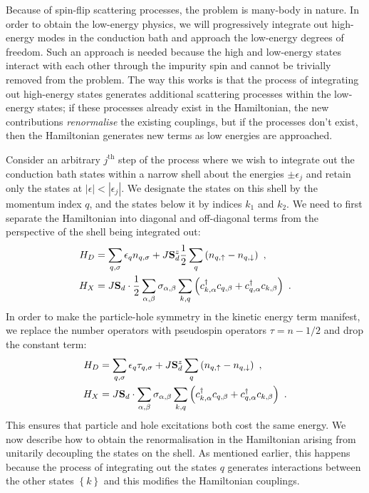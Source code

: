 Because of spin-flip scattering processes, the problem is many-body in nature. In order to obtain the low-energy physics, we will progressively integrate out high-energy modes in the conduction bath and approach the low-energy degrees of freedom. Such an approach is needed because the high and low-energy states interact with each other through the impurity spin and cannot be trivially removed from the problem. The way this works is that the process of integrating out high-energy states generates additional scattering processes within the low-energy states; if these processes already exist in the Hamiltonian, the new contributions {\it renormalise} the existing couplings, but if the processes don't exist, then the Hamiltonian generates new terms as low energies are approached.

Consider an arbitrary \(j^\text{th}\) step of the process where we wish to integrate out the conduction bath states within a narrow shell about the energies \(\pm \epsilon_j\) and retain only the states at \(|\epsilon| < |\epsilon_j|\). We designate the states on this shell by the momentum index \(q\), and the states below it by indices \(k_1 \) and \(k_2\). We need to first separate the Hamiltonian into diagonal and off-diagonal terms from the perspective of the shell being integrated out:
\begin{equation}\begin{aligned}
	H_D &= \sum_{q,\sigma} \epsilon_q n_{q,\sigma} + J {\bf S}_d^z \frac{1}{2}\sum_q \left(n_{q,\uparrow} - n_{q,\downarrow}\right)~,\\
	H_X &= J {\bf S}_d \cdot \frac{1}{2}\sum_{\alpha,\beta}{\bf \sigma}_{\alpha,\beta}\sum_{k, q} \left(c^\dagger_{k,\alpha}c_{q,\beta} + c^\dagger_{q,\alpha}c_{k,\beta}\right)~.
\end{aligned}\end{equation}
In order to make the particle-hole symmetry in the kinetic energy term manifest, we replace the number operators with pseudospin operators \(\tau = n - 1/2\) and drop the constant term:
\begin{equation}\begin{aligned}
	H_D &= \sum_{q,\sigma} \epsilon_q \tau_{q,\sigma} + J {\bf S}_d^z \sum_q \left(n_{q,\uparrow} - n_{q,\downarrow}\right)~,\\
	H_X &= J {\bf S}_d \cdot \sum_{\alpha,\beta}{\bf \sigma}_{\alpha,\beta}\sum_{k, q} \left(c^\dagger_{k,\alpha}c_{q,\beta} + c^\dagger_{q,\alpha}c_{k,\beta}\right)~.
\end{aligned}\end{equation}
This ensures that particle and hole excitations both cost the same energy. We now describe how to obtain the renormalisation in the Hamiltonian arising from unitarily decoupling the states on the shell. As mentioned earlier, this happens because the process of integrating out the states \(q\) generates interactions between the other states \(\left\{k\right\}\) and this modifies the Hamiltonian couplings.

